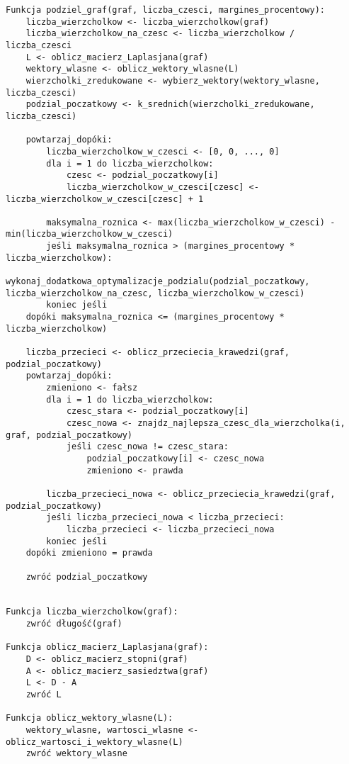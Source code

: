 \documentclass[a4paper,12pt]{article}
\begin{document}
\begin{verbatim}
Funkcja podziel_graf(graf, liczba_czesci, margines_procentowy):
    liczba_wierzcholkow <- liczba_wierzcholkow(graf)
    liczba_wierzcholkow_na_czesc <- liczba_wierzcholkow / liczba_czesci
    L <- oblicz_macierz_Laplasjana(graf)
    wektory_wlasne <- oblicz_wektory_wlasne(L)
    wierzcholki_zredukowane <- wybierz_wektory(wektory_wlasne, liczba_czesci)
    podzial_poczatkowy <- k_srednich(wierzcholki_zredukowane, liczba_czesci)
    
    powtarzaj_dopóki:
        liczba_wierzcholkow_w_czesci <- [0, 0, ..., 0]
        dla i = 1 do liczba_wierzcholkow:
            czesc <- podzial_poczatkowy[i]
            liczba_wierzcholkow_w_czesci[czesc] <- liczba_wierzcholkow_w_czesci[czesc] + 1
        
        maksymalna_roznica <- max(liczba_wierzcholkow_w_czesci) - min(liczba_wierzcholkow_w_czesci)
        jeśli maksymalna_roznica > (margines_procentowy * liczba_wierzcholkow):
            wykonaj_dodatkowa_optymalizacje_podzialu(podzial_poczatkowy, liczba_wierzcholkow_na_czesc, liczba_wierzcholkow_w_czesci)
        koniec jeśli
    dopóki maksymalna_roznica <= (margines_procentowy * liczba_wierzcholkow)

    liczba_przecieci <- oblicz_przeciecia_krawedzi(graf, podzial_poczatkowy)
    powtarzaj_dopóki:
        zmieniono <- fałsz
        dla i = 1 do liczba_wierzcholkow:
            czesc_stara <- podzial_poczatkowy[i]
            czesc_nowa <- znajdz_najlepsza_czesc_dla_wierzcholka(i, graf, podzial_poczatkowy)
            jeśli czesc_nowa != czesc_stara:
                podzial_poczatkowy[i] <- czesc_nowa
                zmieniono <- prawda
        
        liczba_przecieci_nowa <- oblicz_przeciecia_krawedzi(graf, podzial_poczatkowy)
        jeśli liczba_przecieci_nowa < liczba_przecieci:
            liczba_przecieci <- liczba_przecieci_nowa
        koniec jeśli
    dopóki zmieniono = prawda

    zwróć podzial_poczatkowy


Funkcja liczba_wierzcholkow(graf):
    zwróć długość(graf)

Funkcja oblicz_macierz_Laplasjana(graf):
    D <- oblicz_macierz_stopni(graf)
    A <- oblicz_macierz_sasiedztwa(graf)
    L <- D - A
    zwróć L

Funkcja oblicz_wektory_wlasne(L):
    wektory_wlasne, wartosci_wlasne <- oblicz_wartosci_i_wektory_wlasne(L)
    zwróć wektory_wlasne


\end{verbatim}
\end{document}
